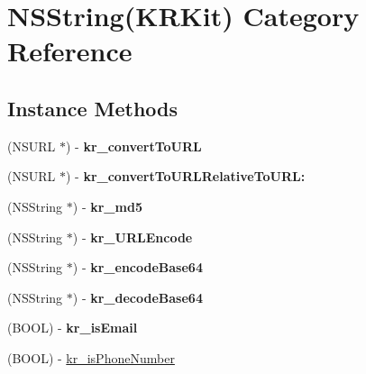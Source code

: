 \hypertarget{category_n_s_string_07_k_r_kit_08}{}\section{N\+S\+String(K\+R\+Kit) Category Reference}
\label{category_n_s_string_07_k_r_kit_08}
\subsection*{Instance Methods}
\begin{DoxyCompactItemize}
\item 
\mbox{\label{category_n_s_string_07_k_r_kit_08_ab4c864db6a4b885f4a7d7ffdf2ff2e5b}} 
(N\+S\+U\+RL $\ast$) -\/ {\bfseries kr\+\_\+convert\+To\+U\+RL}
\item 
\mbox{\label{category_n_s_string_07_k_r_kit_08_a2f9b5eebec8dfe944f56ff761f3317bf}} 
(N\+S\+U\+RL $\ast$) -\/ {\bfseries kr\+\_\+convert\+To\+U\+R\+L\+Relative\+To\+U\+R\+L\+:}
\item 
\mbox{\label{category_n_s_string_07_k_r_kit_08_a58b6df4125acf405ce1da91b8c33740c}} 
(N\+S\+String $\ast$) -\/ {\bfseries kr\+\_\+md5}
\item 
\mbox{\label{category_n_s_string_07_k_r_kit_08_a8512c9efe40188d4d22148acf1b8c554}} 
(N\+S\+String $\ast$) -\/ {\bfseries kr\+\_\+\+U\+R\+L\+Encode}
\item 
\mbox{\label{category_n_s_string_07_k_r_kit_08_a4f438f1f1b446f74848a43e23ac6e048}} 
(N\+S\+String $\ast$) -\/ {\bfseries kr\+\_\+encode\+Base64}
\item 
\mbox{\label{category_n_s_string_07_k_r_kit_08_a93274926663f4758db8318f6ea8a5741}} 
(N\+S\+String $\ast$) -\/ {\bfseries kr\+\_\+decode\+Base64}
\item 
\mbox{\label{category_n_s_string_07_k_r_kit_08_a955b1c7aec8c9f4203e99e9aeeb46b6c}} 
(B\+O\+OL) -\/ {\bfseries kr\+\_\+is\+Email}
\item 
(B\+O\+OL) -\/ \mbox{\hyperlink{category_n_s_string_07_k_r_kit_08_a8bf117f5e3fa8c301b33dd256175c962}{kr\+\_\+is\+Phone\+Number}}

\end{DoxyCompactItemize}
